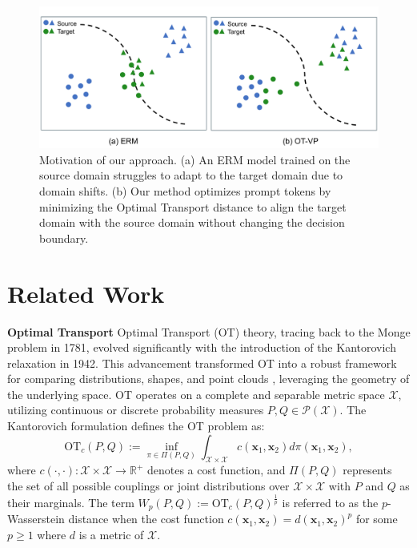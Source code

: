 \documentclass[11pt,a4paper]{article}
\begin{document}
\begin{figure}[t]
    \centering
    \includegraphics[width=1\linewidth]{motivation.pdf}
    \caption{Motivation of our approach. (a) An ERM model trained on the source domain struggles to adapt to the target domain due to domain shifts. (b) Our method optimizes prompt tokens by minimizing the Optimal Transport distance to align the target domain with the source domain without changing the decision boundary.
    }
    \label{fig:motivation}
    \vspace{-0.5cm}
\end{figure}

\section{Related Work}

\textbf{Optimal Transport} Optimal Transport (OT) theory, tracing back to the Monge problem in 1781, evolved significantly with the introduction of the Kantorovich relaxation \cite{kantorovich1942translocation} in 1942. 
This advancement transformed OT into a robust framework for comparing distributions, shapes, and point clouds \cite{peyre2019computational}, leveraging the geometry of the underlying space. 
OT operates on a complete and separable metric space $\mathcal{X}$, utilizing continuous or discrete probability measures $P, Q \in \mathcal{P(X)}$. 
The Kantorovich formulation defines the OT problem as:
\begin{equation}
\mathrm{OT}_c(P, Q) := \mathop{\inf}\limits_{\pi \in \Pi(P, Q)} \int_{\mathcal{X} \times \mathcal{X}} c(\mathbf{x}_1, \mathbf{x}_2)d\pi (\mathbf{x}_1, \mathbf{x}_2),
\end{equation}
where $c(\cdot,\cdot): \mathcal{X}\times\mathcal{X} \rightarrow \mathbb{R^+}$ denotes a cost function, and $\Pi(P, Q)$ represents the set of all possible couplings or joint distributions over $\mathcal{X}\times\mathcal{X}$ with $P$ and $Q$ as their marginals. 
The term $W_p(P,Q) := \mathrm{OT}_c(P, Q)^{\frac{1}{p} }$ is referred to as the $p$-Wasserstein distance when the cost function $c(\mathbf{x}_1, \mathbf{x}_2)=d(\mathbf{x}_1, \mathbf{x}_2)^p$ for some $p\geq1$ where $d$ is a metric of $\mathcal{X}$.
\end{document}
